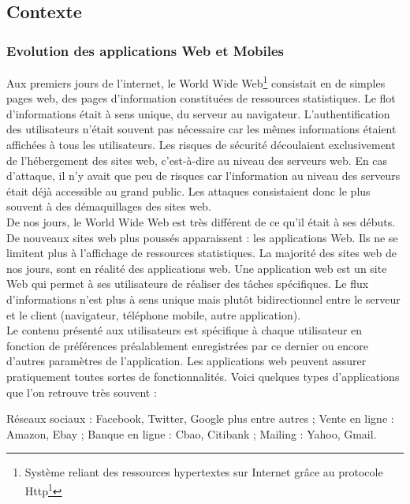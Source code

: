 \subsection{Contexte}
\subsubsection{Evolution des applications Web et Mobiles}
Aux premiers jours de l’internet, le World Wide Web\footnote{Système reliant des ressources hypertextes sur Internet grâce au protocole Http\footnote{L'Hypertext Transfer Protocol, plus connu sous l'abréviation HTTP, littéralement « protocole de transfert hypertexte » est un protocole de communication client-serveur développé pour le World Wide Web}}  consistait en de simples pages web, des pages d’information constituées de ressources statistiques. Le flot d'informations était à sens unique, du serveur au navigateur. L’authentification des utilisateurs n’était souvent pas nécessaire car les mêmes informations étaient affichées à tous les utilisateurs. Les risques de sécurité découlaient exclusivement de l’hébergement des sites web, c’est-à-dire au niveau des serveurs web. En cas d’attaque, il n’y avait que peu de risques car l’information au niveau des serveurs était déjà accessible au grand public. Les attaques consistaient donc le plus souvent à des démaquillages des sites web.\\
De nos jours, le World Wide Web est très différent de ce qu’il était à ses débuts. De nouveaux sites web plus poussés apparaissent : les applications Web. Ils ne se limitent plus à l’affichage de ressources statistiques. La majorité des sites web de nos jours, sont en réalité des applications web. Une application web est un site Web qui permet à ses utilisateurs de réaliser des tâches spécifiques. Le flux d’informations n’est plus à sens unique mais plutôt bidirectionnel entre le serveur et le client (navigateur, téléphone mobile, autre application).\\
Le contenu présenté aux utilisateurs est spécifique à chaque utilisateur en fonction de préférences préalablement enregistrées par ce dernier ou encore d’autres paramètres de l’application. Les applications web peuvent assurer pratiquement toutes sortes de fonctionnalités. Voici quelques types d’applications que l’on retrouve très souvent :
\begin{itemize}
	\itemtirait Réseaux sociaux : Facebook, Twitter, Google plus entre autres ;
	\itemtirait Vente en ligne : Amazon, Ebay ;
	\itemtirait Banque en ligne : Cbao, Citibank ;
	\itemtirait Mailing : Yahoo, Gmail.
\end{itemize}
